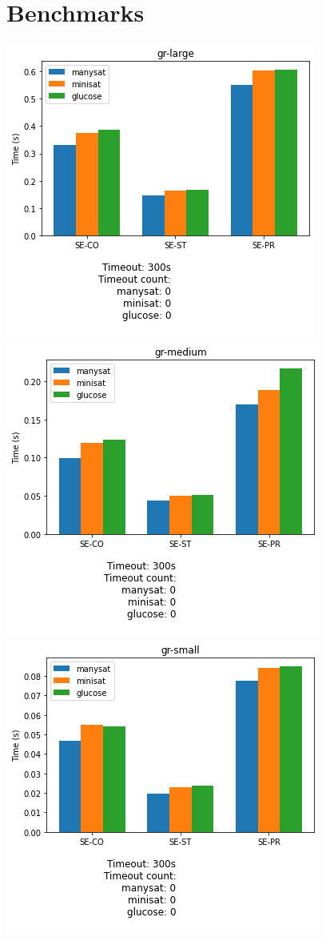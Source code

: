 \documentclass[11pt]{article}
\begin{document}
\section{Benchmarks}

\includegraphics[scale=0.75]{img/gr-large.png}\\
\includegraphics[scale=0.75]{img/gr-medium.png}\\
\includegraphics[scale=0.75]{img/gr-small.png}



\end{document}
